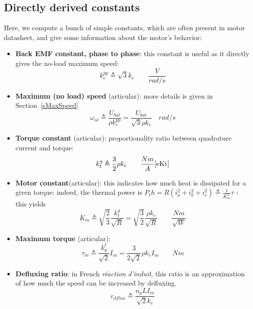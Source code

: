 \documentclass[a4paper,10pt]{article}
\begin{document}
\subsection{Directly derived constants}

Here, we compute a bunch of simple constants, which are often present in motor datasheet, and give some information about the motor's behavior:

\begin{itemize}
	\item \textbf{Back EMF constant, phase to phase}: this constant is useful as it directly gives the no-load maximum speed:
	\begin{equation}
	k^{pp}_e \triangleq \sqrt{3} k_e \qquad \frac{V}{rad/s}
	\end{equation}
	\item \textbf{Maximum (no load) speed} (articular): more details is given in Section~\ref{sMaxSpeed}
	\begin{equation}
	\omega_{nl} \triangleq \frac{U_{bat}}{\rho k^{pp}_e} = \frac{U_{bat}}{\sqrt{3} \rho k_e}  \quad rad/s
	\end{equation}
	\item \textbf{Torque constant} (articular): proportionality ratio between quadrature current and torque:
	\begin{equation}
	k^q_t \triangleq \frac{3}{2} \rho k_e \qquad \frac{Nm}{A}
	\eqref{eKt}
	\end{equation}

	\item \textbf{Motor constant}(articular): this indicates how much heat is dissipated for a given torque: indeed, the thermal power is $P_th = R (i_a^2 + i_b^2 + i_c^2) \triangleq \frac{1}{K_m^2} \tau$ - this yields
	\begin{equation}
		K_m \triangleq \sqrt{\frac{2}{3}} \frac{k^q_t}{\sqrt{R}} = \sqrt{\frac{3}{2}}  \frac{\rho k_e}{\sqrt{R}} \qquad \frac{Nm}{\sqrt{W}}
	\end{equation}
	\item \textbf{Maximum torque} (articular): 
	\begin{equation}
		\tau_m \triangleq \frac{k^t_q}{\sqrt{2}} I_m = \frac{3}{2 \sqrt{2}} \rho k_e I_m \qquad Nm
	\end{equation}

	\item \textbf{Defluxing ratio}: in French \emph{réaction d'induit}, this ratio is an approximation of how much the speed can be increased by defluxing.
	\begin{equation}
	r_{dflux} \triangleq \frac{n_p L I_m}{\sqrt{2} k_e}
	\end{equation}
\end{itemize}
\end{document}
